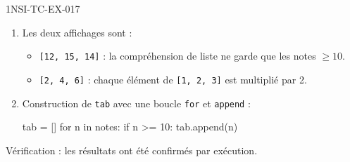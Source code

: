 \begin{corrige}{1NSI-TC-EX-017}
\begin{enumerate}
  \item Les deux affichages sont :
  \begin{itemize}
    \item \lstinline{[12, 15, 14]} : la compréhension de liste ne garde que les notes $\geq 10$.
    \item \lstinline{[2, 4, 6]} : chaque élément de \lstinline{[1, 2, 3]} est multiplié par 2.
  \end{itemize}

  \item Construction de \lstinline{tab} avec une boucle \lstinline{for} et \lstinline{append} :
\begin{python}
tab = []
for n in notes:
    if n >= 10:
        tab.append(n)
\end{python}
\end{enumerate}

Vérification : les résultats ont été confirmés par exécution.
\end{corrige}
